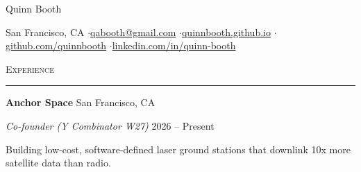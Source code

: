 \documentclass[11pt, letterpaper]{article}
\newcommand{\sectionhead}[1]{%
  \par\vspace{4pt}%
  {\large\scshape #1}\par
  \vspace{-6pt}\rule{\linewidth}{0.4pt}\par
  \vspace{1pt}}
\newcommand{\role}[4]{%
  \par\vspace{3pt}%
  \textbf{#1} \hfill #2\par
  \textit{#3} \hfill #4\par}
\newenvironment{bullets}{%
  \begin{list}{\textbullet}{%
    \setlength{\leftmargin}{1.1em}%
    \setlength{\labelsep}{0.45em}%
    \setlength{\labelwidth}{0.65em}%
    \setlength{\itemsep}{0.5pt}%
    \setlength{\parsep}{0pt}%
    \setlength{\topsep}{1.5pt}%
    \setlength{\partopsep}{0pt}}}%
  {\end{list}}
\newcommand{\meta}[1]{{\small #1}}
\begin{document}
\begin{center}
  {\Huge Quinn Booth}\par
  \vspace{5pt}
  \small
  San Francisco, CA
  \enspace$\cdot$\enspace \href{mailto:qabooth@gmail.com}{qabooth@gmail.com}
  \enspace$\cdot$\enspace \href{https://quinnbooth.github.io}{quinnbooth.github.io}
  \enspace$\cdot$\enspace \href{https://github.com/quinnbooth}{github.com/quinnbooth}
  \enspace$\cdot$\enspace \href{https://www.linkedin.com/in/quinn-booth}{linkedin.com/in/quinn-booth}
\end{center}

\sectionhead{Experience}

\role{Anchor Space}{San Francisco, CA}{Co-founder \meta{(Y Combinator W27)}}{2026 -- Present}
\begin{bullets}
  \item Building low-cost, software-defined laser ground stations that downlink 10x more satellite data than radio.
\end{bullets}
\end{document}
